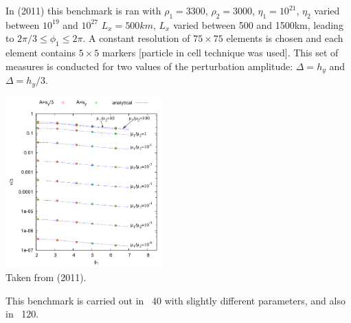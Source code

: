 In \textcite{thie11} (2011) this benchmark is ran with 
$\rho_1=3300$, $\rho_2=3000$, $\eta_1=10^{21}$,
$\eta_2$ varied between $10^{19}$ and $10^{27}$
$L_x=500km$, $L_x$ varied between 500 and 1500km,
leading to $2\pi/3 \le \phi_1 \le 2\pi$.
A constant resolution of $75\times 75$ elements is chosen and each element contains
$5\times 5$ markers [particle in cell technique was used]. 
This set of measures is conducted for two values
of the perturbation amplitude:
$\Delta=h_y$ and $\Delta=h_y/3$.

\begin{center}
\includegraphics[width=6cm]{images/rtwave/thie11}\\
{\captionfont Taken from \textcite{thie11} (2011).}
\end{center}

This benchmark is carried out in \stone~40 with slightly 
different parameters, and also in \stone~120.


